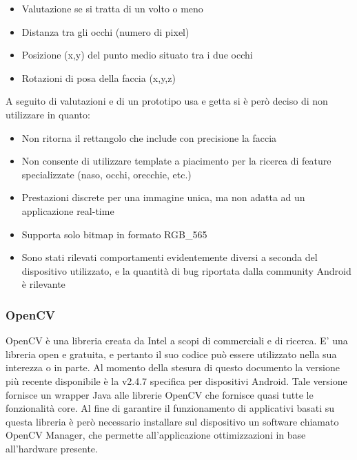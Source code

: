 \begin{itemize}
\item Valutazione se si tratta di un volto o meno 
\item Distanza tra gli occhi (numero di pixel)
\item Posizione (x,y) del punto medio situato tra i due occhi
\item Rotazioni di posa della faccia (x,y,z)
\end{itemize} 

A seguito di valutazioni e di un prototipo usa e getta si è però deciso di non utilizzare in quanto:

\begin{itemize}
\item Non ritorna il rettangolo che include con precisione la faccia

\item Non consente di utilizzare template a piacimento per la ricerca di feature specializzate (naso, occhi, orecchie, etc.)

\item Prestazioni discrete per una immagine unica, ma non adatta ad un applicazione real-time

\item Supporta solo bitmap in formato RGB\_565 

\item Sono stati rilevati comportamenti evidentemente diversi a seconda del dispositivo utilizzato, e la quantità di bug riportata dalla community Android è rilevante
\end{itemize}

\subsubsection{OpenCV}

OpenCV è una libreria creata da Intel a scopi di commerciali e di ricerca. E' una libreria open e gratuita, e pertanto il suo codice può essere utilizzato nella sua interezza o in parte. Al momento della stesura di questo documento la versione più recente disponibile è la v2.4.7 specifica per dispositivi Android. Tale versione fornisce un wrapper Java alle librerie OpenCV che fornisce quasi tutte le fonzionalità core. Al fine di garantire il funzionamento di applicativi basati su questa libreria è però necessario installare sul dispositivo un software chiamato OpenCV Manager, che permette all'applicazione ottimizzazioni in base all'hardware presente.

